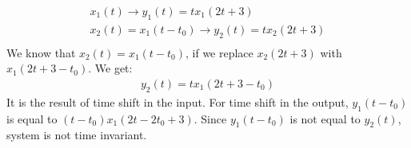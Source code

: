 \documentclass[10pt,a4paper, margin=1in]{article}
\begin{document}
\begin{enumerate}
\begin{enumerate}
\begin{itemize}
        \begin{gather*}
        x_1(t)\rightarrow y_1(t)=tx_1(2t+3)\\
        x_2(t)=x_1(t-t_0) \rightarrow y_2(t)= tx_2(2t+3)\\
        \end{gather*}
        We know that $ x_2(t) = x_1(t-t_0)$, if we replace $x_2(2t+3)$ with $x_1(2t+3-t_0)$. We get:
     \begin{gather*}
         y_2(t) = tx_1(2t+3-t_0)
     \end{gather*}
      It is the result of time shift in the input. For time shift in the output, $y_1(t-t_0)$ is equal to $(t-t_0)x_1(2t-2t_0+3)$. Since $y_1(t-t_0)$ is not equal to $y_2(t)$, system is not time invariant. \\
    \\
    \end{itemize}
    \end{enumerate}


\end{enumerate}
\end{document}
